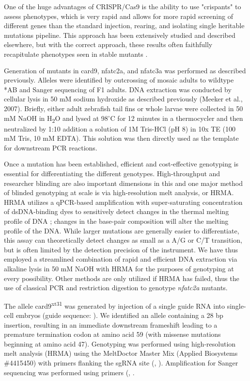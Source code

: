One of the huge advantages of CRISPR/Cas9 is the ability to use "crispants" to assess phenotypes, which is very rapid and allows for more rapid screening of different genes than the standard injection, rearing, and isolating single heritable mutations pipeline. This approach has been extensively studied and described elsewhere, but with the correct approach, these results often faithfully recapitulate phenotypes seen in stable mutants \citep{Zhang2017}.

Generation of mutants in card9, nfatc2a, and nfatc3a was performed as described previously. Alleles were identified by outcrossing of mosaic adults to wildtype *AB and Sanger sequencing of F1 adults. DNA extraction was conducted by cellular lysis in 50 mM sodium hydroxide as described previously (Meeker et al., 2007). Briefly, either adult zebrafish tail fins or whole larvae were collected in 50 mM NaOH in H\textsubscript{2}O and lysed at 98$^{\circ}$C for 12 minutes in a thermocycler and then neutralized by 1:10 addition a solution of 1M Tris-HCl (pH 8) in 10x TE (100 mM Tris, 10 mM EDTA). This solution was then directly used as the template for downstream PCR reactions. 

Once a mutation has been established, efficient and cost-effective genotyping is essential for differentiating the different genotypes. High-throughput and researcher blinding are also important dimensions in this and one major method of blinded genotyping at scale is via high-resolution melt analysis, or HRMA. HRMA utilizes a qPCR-based amplification with super-saturating concentration of dsDNA-binding dyes to sensitively detect changes in the thermal melting profile of DNA \citep{Reed2007}; changes in the base-pair composition will alter the melting profile of the DNA. While larger mutations are generally easier to differentiate, this assay can theoretically detect changes as small as a A/G or C/T transition, but is often limited by the detection precision of the instrument. We have thus employed a streamlined combination of rapid and efficient DNA extraction via alkaline lysis in 50 mM NaOH \citep{Meeker2007} with HRMA for the purposes of genotyping at every possibility. Other methods are only utilized if HRMA has failed, thus the use of classical PCR and restriction digestion to genotype \textit{nfatc2a} mutants.


The allele card9\textsuperscript{xt31} was generated by injection of a single guide RNA into single-cell embryos (guide sequence: ). We identified an allele containing a 28 bp insertion, resulting in an immediate downstream frameshift leading to a premature termination codon at amino acid 59 (with missense mutations beginning at amino acid 47). Genotyping was performed using high-resolution melt analysis (HRMA) using the MeltDoctor Master Mix (Applied Biosystems \#4415450) with primers flanking the sgRNA site (, ). Amplification for Sanger sequencing was performed using primers (, .

